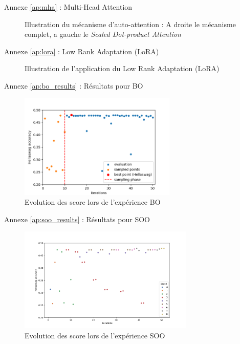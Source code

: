 \begin{frame}{Annexe \ref{ap:mha} : Multi-Head Attention}
    \label{ap:mha}
    \begin{figure}
        \centering
        
        \caption{Illustration du mécanisme d'auto-attention : A droite le mécanisme complet, a gauche le \textit{Scaled Dot-product Attention}}
    \end{figure}
    
\end{frame}

\begin{frame}{Annexe \ref{ap:lora} : Low Rank Adaptation (LoRA)}
    \label{ap:lora}
    \begin{figure}
        \centering
        
        \caption{Illustration de l'application du Low Rank Adaptation (LoRA)}
    \end{figure}
    
\end{frame}


\begin{frame}{Annexe \ref{ap:bo_results} : Résultats pour BO}
    \label{ap:bo_results}
    \begin{figure}
        \centering
        \includegraphics[height = 5cm]{assets/imgs/plots/bo/score_evolution.png}
        \caption{Evolution des score lors de l'expérience BO}
    \end{figure}
\end{frame}

\begin{frame}{Annexe \ref{ap:soo_results} : Résultats pour SOO}
    \label{ap:soo_results}
    \begin{figure}
        \centering
        \includegraphics[height = 5cm]{assets/imgs/plots/soo/score_evolution.png}
        \caption{Evolution des score lors de l'expérience SOO}
    \end{figure} 
\end{frame}

